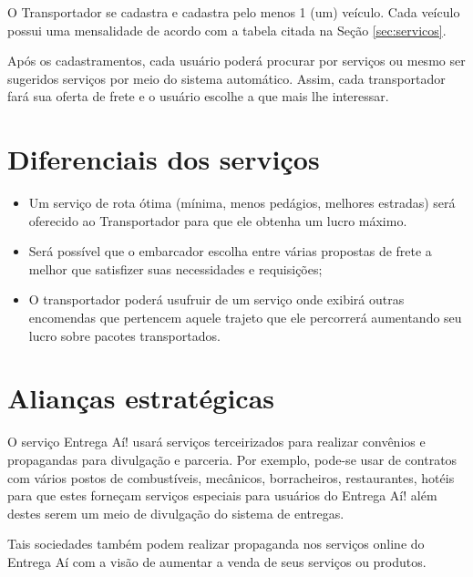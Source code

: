 		O Transportador se cadastra e cadastra pelo menos 1 (um) veículo. Cada veículo possui uma mensalidade de acordo com a tabela citada na Seção \ref{sec:servicos}.
		
		Após os cadastramentos, cada usuário poderá procurar por serviços ou mesmo ser sugeridos serviços por meio do sistema automático. Assim, cada transportador fará sua oferta de frete e o usuário escolhe a que mais lhe interessar.
	
	\section{Diferenciais dos serviços}
    
		\begin{itemize}
        
        	\item Um serviço de rota ótima (mínima, menos pedágios, melhores estradas) será oferecido ao Transportador para que ele obtenha um lucro máximo.
        
			\item Será possível que o embarcador escolha entre várias propostas de frete a melhor que satisfizer suas necessidades e requisições;
			
			\item O transportador poderá usufruir de um serviço onde exibirá outras encomendas que pertencem aquele trajeto que ele percorrerá aumentando seu lucro sobre pacotes transportados.
            
		\end{itemize}
	
	\section{Alianças estratégicas}
    
		O serviço Entrega Aí! usará serviços terceirizados para realizar convênios e propagandas para divulgação e parceria. Por exemplo, pode-se usar de contratos com vários postos de combustíveis, mecânicos, borracheiros, restaurantes, hotéis para que estes forneçam serviços especiais para usuários do Entrega Aí! além destes serem um meio de divulgação do sistema de entregas.
		
		Tais sociedades também podem realizar propaganda nos serviços online do Entrega Aí com a visão de aumentar a venda de seus serviços ou produtos.